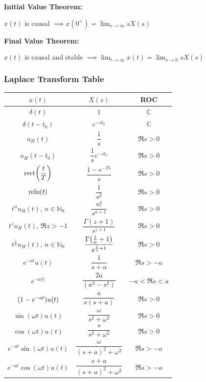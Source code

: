 \documentclass[11pt]{article}
\begin{document}
  \textbf{Initial Value Theorem:}

  \(x(t)\) is causal \(\implies x(0^+) = \displaystyle \lim_{s \to \infty} sX(s)\)

  \textbf{Final Value Theorem:}

  \(x(t)\) is causal and stable \(\implies \displaystyle \lim_{t \to \infty} x(t) =\lim_{s \to 0} sX(s)\)

  \pagebreak

  \subsubsection{Laplace Transform Table}

  \bgroup
  \renewcommand{\arraystretch}{2}
  \setlength{\tabcolsep}{1.2cm}
  \large\begin{tabular}{c|c|c}
    \(x(t)\) & \(X(s)\) & ROC \\
    \hline
    \(\delta(t)\) & \(1\) & \(\mathbb{C}\) \\
    \(\delta(t - t_0)\) & \(e^{-st_0}\) & \(\mathbb{C}\) \\
    \(u_H(t)\) & \(\dfrac{1}{s}\) & \(\Re{s} > 0\) \\
    \(u_H(t - t_0)\) & \(\dfrac{1}{s}e^{-st_0}\) & \(\Re{s} > 0\) \\
    \(\mathrm{rect}{\left( \dfrac{t}{T} \right)}\) & \(\dfrac{1 - e^{-Ts}}{s}\) & \(\Re{s} > 0\) \\
    \(\mathrm{relu}(t)\) & \(\dfrac{1}{s^2}\) & \(\Re{s} > 0\) \\
    \(t^n u_H(t)\), \(n \in \mathbb{N}_0\) & \(\dfrac{n!}{s^{n + 1}}\) & \(\Re{s} > 0\) \\
    \(t^z u_H(t)\), \(\Re{z} > -1\) & \(\dfrac{\Gamma(z + 1)}{s^{z + 1}}\) & \(\Re{s} > 0\) \\
    \(t^{\frac{1}{n}} u_H(t)\),
    \(n \in \mathbb{N}_0\) & \(\dfrac{\Gamma{\left( \frac{1}{n} + 1 \right)}}{s^{\frac{1}{n} + 1}}\) &
    \(\Re{s} > 0\) \\
    \(e^{-at}u(t)\) & \(\dfrac{1}{s + a}\) & \(\Re{s} > -a\) \\
    \(e^{-a|t|}\) & \(\dfrac{2a}{(a^2 - s^2)}\) & \( -a < \Re{s} < a\) \\
    \({\left( 1 - e^{-at} \right)}u(t)\) & \(\dfrac{a}{s(s + a)}\) & \( \Re{s} > 0\) \\
    \(\sin(\omega t)u(t)\) & \(\dfrac{\omega}{s^2 + \omega^2}\) & \( \Re{s} > 0\) \\
    \(\cos(\omega t)u(t)\) & \(\dfrac{s}{s^2 + \omega^2}\) & \( \Re{s} > 0\) \\
    \(e^{-at}\sin(\omega t)u(t)\) & \(\dfrac{\omega}{(s + a)^2 + \omega^2}\) & \(\Re{s} > -a\) \\
    \(e^{-at}\cos(\omega t)u(t)\) & \(\dfrac{s + a}{(s + a)^2 + \omega^2}\) & \(\Re{s} > -a\) \\
  \end{tabular}
\end{document}
